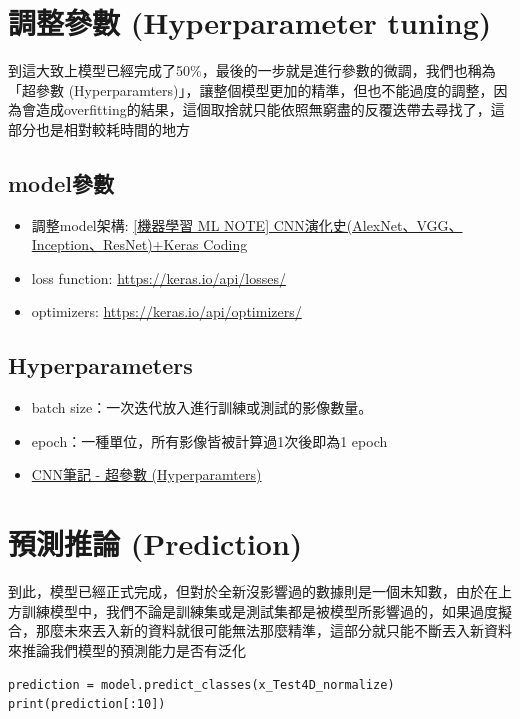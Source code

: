 \documentclass[a4paper,12pt]{article}
\begin{document}
\section{調整參數 (Hyperparameter tuning)}
\label{sec:org1ee0be2}
到這大致上模型已經完成了50\%，最後的一步就是進行參數的微調，我們也稱為「超參數 (Hyperparamters)」，讓整個模型更加的精準，但也不能過度的調整，因為會造成overfitting的結果，這個取捨就只能依照無窮盡的反覆迭帶去尋找了，這部分也是相對較耗時間的地方\\
\subsection{model參數}
\label{sec:org7de6d2d}
\begin{itemize}
\item 調整model架構: \href{https://medium.com/\%E9\%9B\%9E\%E9\%9B\%9E\%E8\%88\%87\%E5\%85\%94\%E5\%85\%94\%E7\%9A\%84\%E5\%B7\%A5\%E7\%A8\%8B\%E4\%B8\%96\%E7\%95\%8C/\%E6\%A9\%9F\%E5\%99\%A8\%E5\%AD\%B8\%E7\%BF\%92-ml-note-cnn\%E6\%BC\%94\%E5\%8C\%96\%E5\%8F\%B2-alexnet-vgg-inception-resnet-keras-coding-668f74879306}{[機器學習 ML NOTE] CNN演化史(AlexNet、VGG、Inception、ResNet)+Keras Coding}\\
\item loss function: \url{https://keras.io/api/losses/}\\
\item optimizers: \url{https://keras.io/api/optimizers/}\\
\end{itemize}
\subsection{Hyperparameters}
\label{sec:orgc63218d}
\begin{itemize}
\item batch size：一次迭代放入進行訓練或測試的影像數量。\\
\item epoch：一種單位，所有影像皆被計算過1次後即為1 epoch\\
\item \href{http://elmer-storage.blogspot.com/2018/06/cnn-hyperparamters.html}{CNN筆記 - 超參數 (Hyperparamters) }\\
\end{itemize}

\section{預測推論 (Prediction)}
\label{sec:orgb5d60ad}
到此，模型已經正式完成，但對於全新沒影響過的數據則是一個未知數，由於在上方訓練模型中，我們不論是訓練集或是測試集都是被模型所影響過的，如果過度擬合，那麼未來丟入新的資料就很可能無法那麼精準，這部分就只能不斷丟入新資料來推論我們模型的預測能力是否有泛化\\
\lstset{breaklines=true,language=Python,label= ,caption= ,captionpos=b,numbers=none}
\begin{lstlisting}
prediction = model.predict_classes(x_Test4D_normalize)
print(prediction[:10])
\end{lstlisting}
\end{document}
